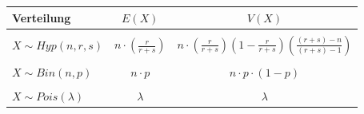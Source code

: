 \begin{table}[h!]
	\centering
	\begin{tabular}{l c c}
		Verteilung
			& $E(X)$
			& $V(X)$ \\
		\hline
		& & \\
		$X \sim Hyp(n,r,s)$
			& $n \cdot \left(\frac{r}{r+s}\right)$
			& $n \cdot \left( 
				\frac{r}{r+s}
				\right) 
			\left( 
				1 - \frac{r}{r+s}
			\right)
			\left(
				\frac{(r+s)-n}{(r+s)-1}
			\right)$ \\
		& & \\
		$X \sim Bin(n,p)$
			& $n \cdot p$
			& $n \cdot p \cdot (1-p)$ \\
		& & \\
		$X \sim Pois(\lambda)$
			& $\lambda$
			& $\lambda$
	\end{tabular}
\end{table}

